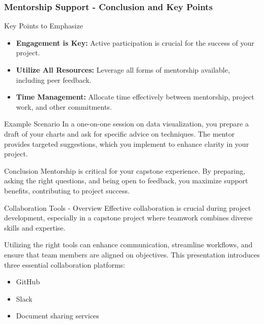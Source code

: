 \documentclass[aspectratio=169]{beamer}
\begin{document}
\begin{frame}[fragile]
    \frametitle{Mentorship Support - Conclusion and Key Points}
    \begin{block}{Key Points to Emphasize}
        \begin{itemize}
            \item \textbf{Engagement is Key:} Active participation is crucial for the success of your project.
            \item \textbf{Utilize All Resources:} Leverage all forms of mentorship available, including peer feedback.
            \item \textbf{Time Management:} Allocate time effectively between mentorship, project work, and other commitments.
        \end{itemize}
    \end{block}

    \begin{block}{Example Scenario}
        In a one-on-one session on data visualization, you prepare a draft of your charts and ask for specific advice on techniques. The mentor provides targeted suggestions, which you implement to enhance clarity in your project.
    \end{block}

    \begin{block}{Conclusion}
        Mentorship is critical for your capstone experience. By preparing, asking the right questions, and being open to feedback, you maximize support benefits, contributing to project success.
    \end{block}
\end{frame}

\begin{frame}[fragile]{Collaboration Tools - Overview}
  Effective collaboration is crucial during project development, especially in a capstone project where teamwork combines diverse skills and expertise. 

  Utilizing the right tools can enhance communication, streamline workflows, and ensure that team members are aligned on objectives. This presentation introduces three essential collaboration platforms:
  \begin{itemize}
    \item GitHub
    \item Slack
    \item Document sharing services
  \end{itemize}
\end{frame}
\end{document}
